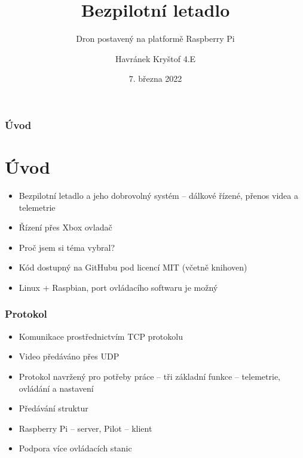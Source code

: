 \documentclass[aspectratio=43]{beamer}
\title{Bezpilotní letadlo}
\subtitle{Dron postavený na platformě Raspberry Pi}
\author{Havránek Kryštof 4.E}
\date{7. března 2022}
\institute{Gymnázium, Praha 6, Arabská 14}
\begin{document}
\begin{frame}[plain]
	\maketitle
\end{frame}

\clearpage
\setcounter{framenumber}{0}

\begin{frame}[fragile]
	\frametitle{Úvod}
	\section{Úvod}

	\begin{itemize}
		\item Bezpilotní letadlo a jeho dobrovolný systém -- dálkové řízené, přenos videa a telemetrie
		\item Řízení přes Xbox ovladač
		\item Proč jsem si téma vybral? %
		\item Kód dostupný na GitHubu pod licencí MIT (včetně knihoven)
		\item Linux + Raspbian, port ovládacího softwaru je možný
	\end{itemize}
\end{frame}

\begin{frame}[fragile]
	\frametitle{Protokol}
	\begin{itemize}
		\item Komunikace prostřednictvím TCP protokolu
		\item Video předáváno přes UDP
		\item Protokol navržený pro potřeby práce -- tři základní funkce -- telemetrie, ovládání a nastavení
		\item Předávání struktur
		\item Raspberry Pi -- server, Pilot -- klient
		\item Podpora více ovládacích stanic
	\end{itemize}
\end{frame}
\end{document}
